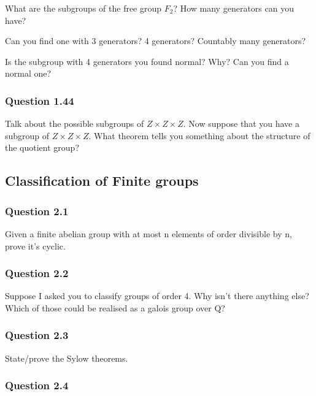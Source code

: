 What are the subgroups of the free group \(F_2\)? How many generators
can you have?

Can you find one with 3 generators? 4 generators? Countably many
generators?

Is the subgroup with 4 generators you found normal? Why? Can you find a
normal one?

\hypertarget{question-1.44}{%
\subsubsection{Question 1.44}\label{question-1.44}}

Talk about the possible subgroups of \(Z\times Z \times Z\). Now suppose
that you have a subgroup of \(Z \times Z \times Z\). What theorem tells
you something about the structure of the quotient group?

\hypertarget{classification-of-finite-groups}{%
\subsection{Classification of Finite
groups}\label{classification-of-finite-groups}}

\hypertarget{question-2.1}{%
\subsubsection{Question 2.1}\label{question-2.1}}

Given a finite abelian group with at most n elements of order divisible
by n, prove it's cyclic.

\hypertarget{question-2.2}{%
\subsubsection{Question 2.2}\label{question-2.2}}

Suppose I asked you to classify groups of order 4. Why isn't there
anything else? Which of those could be realised as a galois group over
Q?

\hypertarget{question-2.3}{%
\subsubsection{Question 2.3}\label{question-2.3}}

State/prove the Sylow theorems.

\hypertarget{question-2.4}{%
\subsubsection{Question 2.4}\label{question-2.4}}

